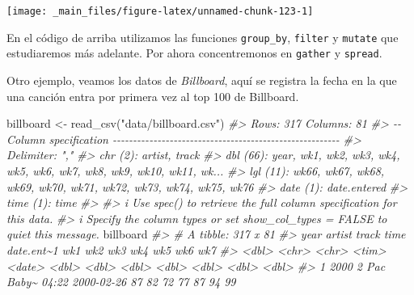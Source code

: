 \documentclass[
]{book}
\newenvironment{Shaded}{\begin{snugshade}}{\end{snugshade}}
\newcommand{\CommentTok}[1]{\textcolor[rgb]{0.56,0.35,0.01}{\textit{#1}}}
\newcommand{\FunctionTok}[1]{\textcolor[rgb]{0.00,0.00,0.00}{#1}}
\newcommand{\NormalTok}[1]{#1}
\newcommand{\OtherTok}[1]{\textcolor[rgb]{0.56,0.35,0.01}{#1}}
\newcommand{\StringTok}[1]{\textcolor[rgb]{0.31,0.60,0.02}{#1}}
\begin{document}
\begin{center}\texttt{[image: \_main\_files/figure-latex/unnamed-chunk-123-1]} \end{center}

En el código de arriba utilizamos las funciones \texttt{group\_by}, \texttt{filter} y \texttt{mutate}
que estudiaremos más adelante. Por ahora concentremonos en \texttt{gather} y \texttt{spread}.

Otro ejemplo, veamos los datos de \emph{Billboard}, aquí se registra la fecha en la
que una canción entra por primera vez al top 100 de Billboard.

\begin{Shaded}
\begin{Highlighting}[]
\NormalTok{billboard }\OtherTok{\textless{}{-}} \FunctionTok{read\_csv}\NormalTok{(}\StringTok{"data/billboard.csv"}\NormalTok{)}
\CommentTok{\#\textgreater{} Rows: 317 Columns: 81}
\CommentTok{\#\textgreater{} {-}{-} Column specification {-}{-}{-}{-}{-}{-}{-}{-}{-}{-}{-}{-}{-}{-}{-}{-}{-}{-}{-}{-}{-}{-}{-}{-}{-}{-}{-}{-}{-}{-}{-}{-}{-}{-}{-}{-}{-}{-}{-}{-}{-}{-}{-}{-}{-}{-}{-}{-}{-}{-}{-}{-}{-}{-}{-}{-}}
\CommentTok{\#\textgreater{} Delimiter: ","}
\CommentTok{\#\textgreater{} chr   (2): artist, track}
\CommentTok{\#\textgreater{} dbl  (66): year, wk1, wk2, wk3, wk4, wk5, wk6, wk7, wk8, wk9, wk10, wk11, wk...}
\CommentTok{\#\textgreater{} lgl  (11): wk66, wk67, wk68, wk69, wk70, wk71, wk72, wk73, wk74, wk75, wk76}
\CommentTok{\#\textgreater{} date  (1): date.entered}
\CommentTok{\#\textgreater{} time  (1): time}
\CommentTok{\#\textgreater{} }
\CommentTok{\#\textgreater{} i Use \textasciigrave{}spec()\textasciigrave{} to retrieve the full column specification for this data.}
\CommentTok{\#\textgreater{} i Specify the column types or set \textasciigrave{}show\_col\_types = FALSE\textasciigrave{} to quiet this message.}
\NormalTok{billboard}
\CommentTok{\#\textgreater{} \# A tibble: 317 x 81}
\CommentTok{\#\textgreater{}     year artist track time  date.ent\textasciitilde{}1   wk1   wk2   wk3   wk4   wk5   wk6   wk7}
\CommentTok{\#\textgreater{}    \textless{}dbl\textgreater{} \textless{}chr\textgreater{}  \textless{}chr\textgreater{} \textless{}tim\textgreater{} \textless{}date\textgreater{}     \textless{}dbl\textgreater{} \textless{}dbl\textgreater{} \textless{}dbl\textgreater{} \textless{}dbl\textgreater{} \textless{}dbl\textgreater{} \textless{}dbl\textgreater{} \textless{}dbl\textgreater{}}
\CommentTok{\#\textgreater{}  1  2000 2 Pac  Baby\textasciitilde{} 04:22 2000{-}02{-}26    87    82    72    77    87    94    99}

\end{Highlighting}
\end{Shaded}
\end{document}
